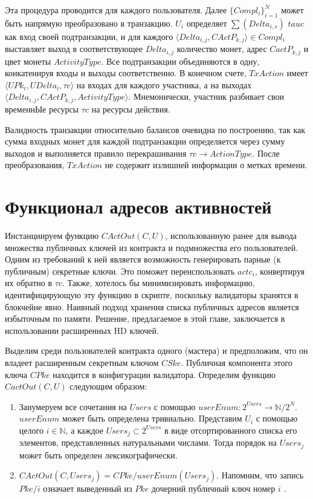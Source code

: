 \documentclass[specification,annotation]{itmo-student-thesis}
\begin{document}
Эта процедура проводится для каждого пользователя. Далее
$\{Compl_i\}_{i=1}^N$ может быть напрямую преобразовано в
транзакцию. $U_i$ определяет $\sum(Delta_{i,s})$ $tauc$ как вход своей
подтранзакции, и для каждого $\langle Delta_{i,j}, CActP_{k,j}\rangle
\in Compl_i$ выставляет выход в соответствующее $Delta_{i,j}$
количество монет, адрес $CactP_{k,j}$ и цвет монеты
$ActivityType$. Все подтранзакции объединяются в одну, конкатенируя
входы и выходы соответственно. В конечном счете, $TxAction$ имеет
$\langle UPk_i, UDelta_i, \tau c\rangle$ на входах для каждого
участника, а на выходах $\langle Delta_{i,j}, CActP_{k,j},
ActivityType\rangle$. Мнемонически, участник разбивает свои временнЫе
ресурсы $\tau c$ на ресурсы действия.

Валидность транзакции относительно балансов очевидна по построению,
так как сумма входных монет для каждой подтранзакции определяется
через сумму выходов и выполняется правило перекрашивания $\tau c
\rightarrow ActionType$. После преобразования, $TxAction$ не содержит
излишней информации о метках времени.

\section{Функционал адресов активностей}

Инстанциируем функцию $CActOut(C, U)$, использованную ранее для вывода
множества публичных ключей из контракта и подмножества его
пользователей. Одним из требований к ней является возможность
генерировать парные (к публичным) секретные ключи. Это поможет
переиспользовать $actc_i$, конвертируя их обратно в $\tau c$. Также,
хотелось бы минимизировать информацию, идентифицирующую эту функцию в
скрипте, поскольку валидаторы хранятся в блокчейне явно. Наивный
подход хранения списка публичных адресов является избыточным по
памяти. Решение, предлагаемое в этой главе, заключается в
использовании расширенных HD ключей.

Выделим среди пользователей контракта одного (мастера) и предположим,
что он владеет расширенным секретным ключом $CSke$. Публичная
компонента этого ключа $CPke$ находится в конфигурации
валидатора. Определим функцию $CactOut(C,U)$ следующим образом:

\begin{enumerate}
\item Занумеруем все сочетания на $Users$ с помощью $userEnum :
  2^{Users} \rightarrow \mathbb{N} / 2^N$. $userEnum$ может быть
  определена тривиально. Представим $U_i$ с помощью целого $i \in
  \mathbb{N}$, а каждое $Users_j \subset 2^{Users}$ в виде
  отсортированного списка его элементов, представленных натуральными
  числами. Тогда порядок на $Users_j$ может быть определен
  лексикографически.
\item $CActOut(C,Users_j) = CPke/userEnum(Users_j)$. Напомним, что
  запись $Pke/i$ означает выведенный из $Pke$ дочерний публичный ключ
  номер $i$ .
\end{enumerate}
\end{document}
